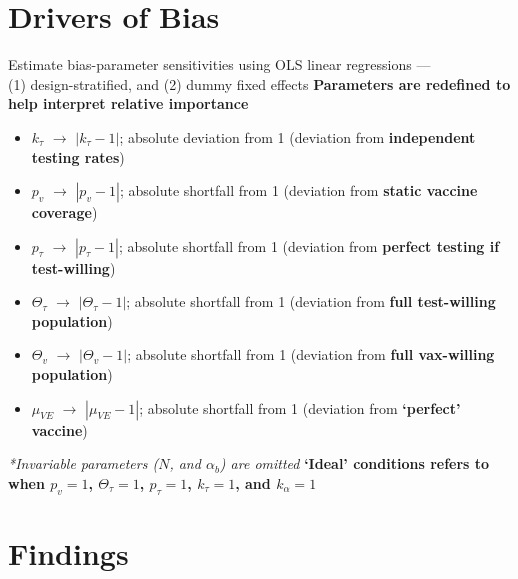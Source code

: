 \documentclass[aspectratio=169]{beamer}
\begin{document}
\section{Drivers of Bias}
\begin{frame}{Estimate bias-parameter sensitivities using OLS linear regressions --- \\ (1) design-stratified, and (2) dummy fixed effects}
	\centering
	\textbf{Parameters are redefined to help interpret relative importance}
	\small
	\begin{itemize}
		\item $k_\tau$ $\rightarrow$ $|k_\tau - 1|$; absolute deviation from 1 (deviation from \textbf{independent testing rates})
		\item $p_v$ $\rightarrow$ $|p_v - 1|$; absolute shortfall from 1 (deviation from \textbf{static vaccine coverage})
		\item $p_\tau$ $\rightarrow$ $|p_\tau - 1|$; absolute shortfall from 1 (deviation from \textbf{perfect testing if test-willing})
		\item $\Theta_\tau$ $\rightarrow$ $|\Theta_\tau - 1|$; absolute shortfall from 1 (deviation from \textbf{full test-willing population})
		\item $\Theta_{v}$ $\rightarrow$ $|\Theta_{v} - 1|$; absolute shortfall from 1 (deviation from \textbf{full vax-willing population})
		\item $\mu_{VE}$ $\rightarrow$ $|\mu_{VE} - 1|$; absolute shortfall from 1 (deviation from \textbf{`perfect' vaccine})
	\end{itemize}
	\centering
	\textit{*Invariable parameters ($N$, and $\alpha_{b}$) are omitted}
	\textbf{`Ideal' conditions refers to when $p_v=1$, $\Theta_{\tau}=1$, $p_{\tau}=1$, $k_{\tau}=1$, and $k_{\alpha}=1$}
\end{frame}

\section{Findings}
\end{document}

